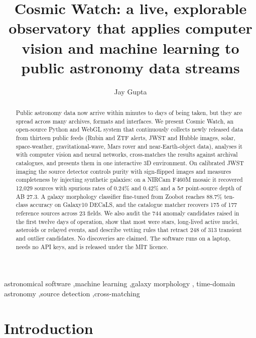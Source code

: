 \documentclass[preprint,11pt,authoryear]{elsarticle}
\begin{document}
\begin{frontmatter}

\title{Cosmic Watch: a live, explorable observatory that applies computer vision
and machine learning to public astronomy data streams}

\author[nmims]{Jay Gupta}

\begin{abstract}
Public astronomy data now arrive within minutes to days of being taken, but they
are spread across many archives, formats and interfaces. We present Cosmic Watch,
an open-source Python and WebGL system that continuously collects newly released
data from thirteen public feeds (Rubin and ZTF alerts, JWST and Hubble images,
solar, space-weather, gravitational-wave, Mars rover and near-Earth-object
data), analyses it with computer vision and neural networks, cross-matches the
results against archival catalogues, and presents them in one interactive 3D
environment. On calibrated JWST imaging the source detector controls purity with
sign-flipped images and measures completeness by injecting synthetic galaxies:
on a NIRCam F460M mosaic it recovered 12,029 sources with spurious rates of
0.24\% and 0.42\% and a 5$\sigma$ point-source depth of AB 27.3. A galaxy
morphology classifier fine-tuned from Zoobot reaches 88.7\% ten-class accuracy
on Galaxy10 DECaLS, and the catalogue matcher recovers 175 of 177 reference
sources across 23 fields. We also audit the 744 anomaly candidates raised in the
first twelve days of operation, show that most were stars, long-lived active
nuclei, asteroids or relayed events, and describe vetting rules that retract
248 of 313 transient and outlier candidates. No discoveries are claimed. The
software runs on a laptop, needs no API keys, and is released under the MIT
licence.
\end{abstract}

\begin{keyword}
astronomical software \sep machine learning \sep galaxy morphology \sep
time-domain astronomy \sep source detection \sep cross-matching
\end{keyword}

\end{frontmatter}

\section{Introduction}
\end{document}
